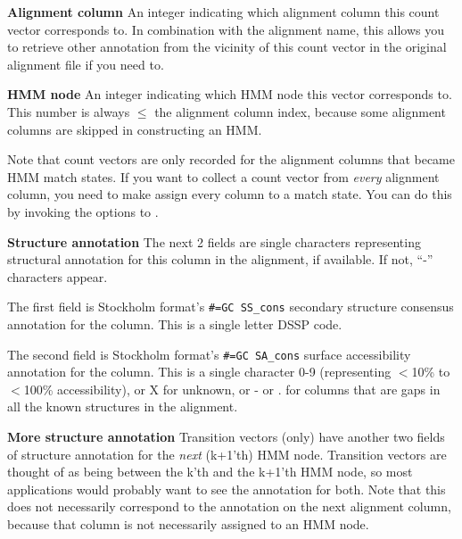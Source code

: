 \begin{wideitem}
\item[\textbf{Alignment column}] An integer indicating which alignment
column this count vector corresponds to. In combination with the
alignment name, this allows you to retrieve other annotation from the
vicinity of this count vector in the original alignment file if you
need to.

\item[\textbf{HMM node}] An integer indicating which HMM node this
vector corresponds to. This number is always $\leq$ the alignment
column index, because some alignment columns are skipped in
constructing an HMM. 

Note that count vectors are only recorded for the alignment columns
that became HMM match states. If you want to collect a count vector
from \emph{every} alignment column, you need to make 
assign every column to a match state. You can do this by invoking the
 options to .

\item[\textbf{Structure annotation}] The next 2
fields are single characters representing structural annotation
for this column in the alignment, if available. If not,
``-'' characters appear.

The first field is Stockholm format's \verb+#=GC SS_cons+ secondary
structure consensus annotation for the column. This is a single letter
DSSP code.

The second field is Stockholm format's \verb+#=GC SA_cons+ surface
accessibility annotation for the column. This is a single character
0-9 (representing $<$10\% to $<$100\% accessibility), or X for
unknown, or - or . for columns that are gaps in all the known
structures in the alignment.

\item[\textbf{More structure annotation}] Transition vectors
(only) have another two fields of structure annotation for the 
\emph{next} (k+1'th) HMM node. Transition vectors are thought of as
being between the k'th and the k+1'th HMM node, so most applications
would probably want to see the annotation for both.  Note that this
does not necessarily correspond to the annotation on the next
alignment column, because that column is not necessarily assigned to
an HMM node.

\end{wideitem}



